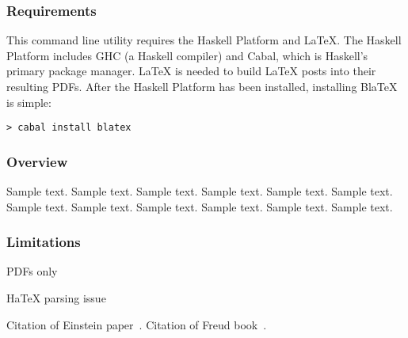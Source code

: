 \documentclass[jou,apacite]{apa6}
\begin{document}
\subsubsection{Requirements}

This command line utility requires the Haskell Platform and LaTeX. The Haskell Platform includes GHC (a Haskell compiler) and Cabal, which is Haskell's primary package manager. LaTeX is needed to build LaTeX posts into their resulting PDFs. After the Haskell Platform has been installed, installing BlaTeX is simple:

\begin{lstlisting}
> cabal install blatex
\end{lstlisting}

\subsubsection{Overview}
Sample text. Sample text. Sample text. Sample text. Sample text. Sample text. 
Sample text. Sample text. Sample text. Sample text. Sample text. Sample text. 


\subsubsection{Limitations}

PDFs only

HaTeX parsing issue

Citation of Einstein paper~\cite{Einstein}. Citation of Freud book~\cite{Freud}.


\end{document}
